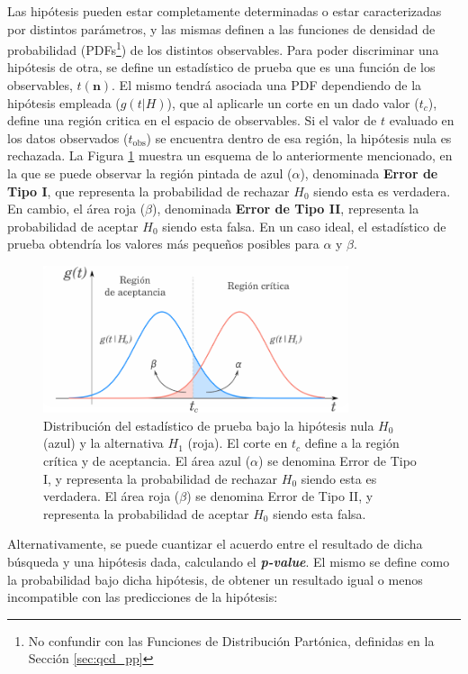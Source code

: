 Las hipótesis pueden estar completamente determinadas o estar caracterizadas por distintos parámetros, y las mismas definen a las funciones de densidad de probabilidad (PDFs\footnote{No confundir con las Funciones de Distribución Partónica, definidas en la Sección \ref{sec:qcd_pp}}) de los distintos observables. Para poder discriminar una hipótesis de otra, se define un estadístico de prueba que es una función de los observables, $t(\textbf{n})$. El mismo tendrá asociada una PDF dependiendo de la hipótesis empleada ($g(t|H)$), que al aplicarle un corte en un dado valor ($t_c$), define una región critica en el espacio de observables. Si el valor de $t$ evaluado en los datos observados ($t_{\text{obs}}$) se encuentra dentro de esa región, la hipótesis nula es rechazada. La Figura \ref{fig:nullh} muestra un esquema de lo anteriormente mencionado, en la que se puede observar la región pintada de azul ($\alpha$), denominada \textbf{Error de Tipo I}, que representa la probabilidad de rechazar $H_0$ siendo esta es verdadera. En cambio, el área roja ($\beta$), denominada \textbf{Error de Tipo II}, representa la probabilidad de aceptar $H_0$ siendo esta falsa. En un caso ideal, el estadístico de prueba obtendría los valores más pequeños posibles para $\alpha$ y $\beta$.

\begin{figure}
  \centering
  \includegraphics[width=0.8\textwidth]{images/statistics/hypo_test.pdf}
  \caption{Distribución del estadístico de prueba bajo la hipótesis nula $H_0$ (azul) y la alternativa $H_1$ (roja). El corte en $t_c$ define a la región crítica y de aceptancia. El área azul ($\alpha$) se denomina Error de Tipo I, y representa la probabilidad de rechazar $H_0$ siendo esta es verdadera. El área roja ($\beta$) se denomina Error de Tipo II, y representa la probabilidad de aceptar $H_0$ siendo esta falsa.}
  \label{fig:nullh}
\end{figure}


Alternativamente, se puede cuantizar el acuerdo entre el resultado de dicha búsqueda y una hipótesis dada, calculando el \textbf{\textit{p-value}}. El mismo se define como la probabilidad bajo dicha hipótesis, de obtener un resultado igual o menos incompatible con las predicciones de la hipótesis:

